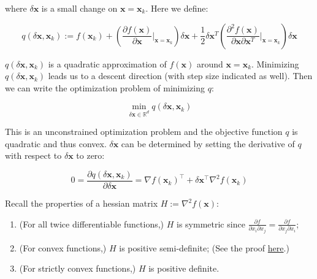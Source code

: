 where $\delta \textbf{x}$ is a small change on $\textbf{x} = \textbf{x}_k$. Here we define:

\begin{equation}
    q(\delta \textbf{x}, \textbf{x}_k) := 
    f(\textbf{x}_k) + 
    (\frac{\partial f(\textbf{x})}{\partial \textbf{x}} |_{\textbf{x}=\textbf{x}_k})
    \delta \textbf{x} +
    \frac{1}{2}\delta \textbf{x}^T (\frac{\partial^2 f(\textbf{x})}
    {\partial \textbf{x} \partial \textbf{x}^T}|_{\textbf{x}=\textbf{x}_k})
    \delta \textbf{x}
    \label{q}
\end{equation}

$q(\delta \textbf{x}, \textbf{x}_k)$ is a quadratic approximation of $f(\textbf{x})$
around $\textbf{x} = \textbf{x}_k$. Minimizing $q(\delta \textbf{x}, \textbf{x}_k)$
leads us to a descent direction (with step size indicated as well).
Then we can write the optimization problem of minimizing $q$:

\begin{equation}
    \min_{\delta \textbf{x} \in \mathbb{R}^d}{q(\delta \textbf{x}, \textbf{x}_k)}
\end{equation}

This is an unconstrained optimization problem and the objective function $q$ is quadratic 
and thus convex. $\delta \textbf{x}$ can be determined by setting the derivative of $q$ with respect
to $\delta \textbf{x}$ to zero:

\begin{equation}
    0=\frac{\partial q\left(\delta \mathbf{x}, \mathbf{x}_k\right)}{\partial \delta \mathbf{x}}=\nabla f\left(\mathbf{x}_k\right)^{\top}+\delta \mathbf{x}^{\top} \nabla^2 f\left(\mathbf{x}_k\right)
    \label{newton2}
\end{equation}

Recall the properties of a hessian matrix $H := \nabla^2 f(\mathbf{x})$:
\begin{enumerate}
    \item (For all twice differentiable functions,) $H$ is symmetric since $\frac{\partial f}{\partial x_i \partial x_j} = \frac{\partial f}{\partial x_j \partial x_i}$;
    \item (For convex functions,) $H$ is positive semi-definite; (See the proof \href{chrome-extension://efaidnbmnnnibpcajpcglclefindmkaj/https://wiki.math.ntnu.no/_media/tma4180/2016v/note2.pdf}{here}.)
    \item (For strictly convex functions,) $H$ is positive definite.
\end{enumerate}

